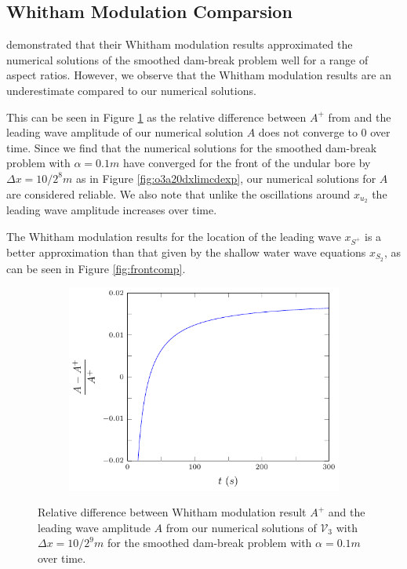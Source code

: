 \documentclass[times]{elsarticle}
\begin{document}
\subsection{Whitham Modulation Comparsion}
\citet{El-etal-2006} demonstrated that their Whitham modulation results approximated the numerical solutions of the smoothed dam-break problem well for a range of aspect ratios. However, we observe that the Whitham modulation results are an underestimate compared to our numerical solutions.

This can be seen in Figure \ref{fig:amplitudefront} as the relative difference between $A^+$ from \citet{El-etal-2006} and the leading wave amplitude of our numerical solution $A$ does not converge to $0$ over time. Since we find that the numerical solutions for the smoothed dam-break problem with $\alpha = 0.1m$ have converged for the front of the undular bore by $\Delta x = 10/2^{8}m$ as in Figure \ref{fig:o3a20dxlimcdexp}, our numerical solutions for $A$ are considered reliable. We also note that unlike the oscillations around $x_{u_2}$ the leading wave amplitude increases over time.

The Whitham modulation results for the location of the leading wave $x_{S^+}$ is a better approximation than that given by the shallow water wave equations $x_{S_2}$, as can be seen in Figure \ref{fig:frontcomp}.
\begin{figure}
	\centering
	\begin{subfigure}{0.55\textwidth}\centering
		\includegraphics[width=\textwidth]{pics/results/SDB/numsols/300s/a.pdf}
	\end{subfigure}%
	\caption{Relative difference between Whitham modulation result $A^+$ and the leading wave amplitude $A$ from our numerical solutions of $\mathcal{V}_3$ with $\Delta x = 10/2^{9}m$ for the smoothed dam-break problem with $\alpha = 0.1m$ over time.}
	\label{fig:amplitudefront}
\end{figure}
\end{document}
